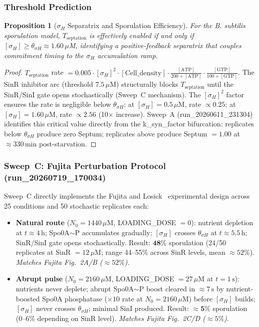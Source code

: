 \documentclass[10pt,letterpaper]{article}
\newtheorem{proposition}{Proposition}
\begin{document}
\subsubsection{Threshold Prediction}

\begin{proposition}[$\sigma_H$ Separatrix and Sporulation Efficiency]
\label{prop:sigmaH_separatrix}
For the \textit{B. subtilis} sporulation model, $T_{\mathrm{septation}}$ is effectively enabled if and only if $[\sigma_H] \geq \theta_{\sigma H} \approx 1.60\,\mu$M, identifying a positive-feedback separatrix that couples commitment timing to the $\sigma_H$ accumulation ramp.
\end{proposition}

\begin{proof}
$T_{\mathrm{septation}}$ rate $= 0.005 \cdot [\sigma_H]^2 \cdot [\text{Cell\_density}] \cdot \frac{[\text{ATP}]}{200 + [\text{ATP}]} \cdot \frac{[\text{GTP}]}{100 + [\text{GTP}]}$.
The SinR inhibitor arc (threshold $7.5\,\mu$M) structurally blocks $T_{\mathrm{septation}}$ until the SinR/SinI gate opens stochastically (Sweep~C mechanism). The $[\sigma_H]^2$ factor ensures the rate is negligible below $\theta_{\sigma H}$: at $[\sigma_H] = 0.5\,\mu$M, rate $\propto 0.25$; at $[\sigma_H] = 1.60\,\mu$M, rate $\propto 2.56$ (10$\times$ increase). Sweep~A (run\_20260611\_231304) identifies this critical value directly from the k\_syn\_factor bifurcation: replicates below $\theta_{\sigma H}$ produce zero Septum; replicates above produce Septum $= 1.00$ at $\approx 330\,\text{min}$ post-starvation.
\end{proof}

\subsubsection{Sweep~C: Fujita Perturbation Protocol (run\_20260719\_170034)}

Sweep~C directly implements the Fujita and Losick~\cite{fujita2005} experimental design across 25 conditions and 50 stochastic replicates each:

\begin{itemize}
\item \textbf{Natural route} ($N_0 = 1440\,\mu$M, LOADING\_DOSE $= 0$): nutrient depletion at $t \approx 4\,\text{h}$; Spo0A$\sim$P accumulates gradually; $[\sigma_H]$ crosses $\theta_{\sigma H}$ at $t \approx 5.5\,\text{h}$; SinR/SinI gate opens stochastically. Result: $\mathbf{48\%}$ sporulation (24/50 replicates at SinR $= 12\,\mu$M; range 44--55\% across SinR levels, mean $\approx 52\%$). \emph{Matches Fujita Fig.~2A/B ($\approx 52\%$)}.
\item \textbf{Abrupt pulse} ($N_0 = 2160\,\mu$M, LOADING\_DOSE $= 27\,\mu$M at $t = 1\,\text{s}$): nutrients never deplete; abrupt Spo0A$\sim$P boost cleared in $\approx 7\,\text{s}$ by nutrient-boosted Spo0A phosphatase ($\times 10$ rate at $N_0 = 2160\,\mu$M) before $[\sigma_H]$ builds; $[\sigma_H]$ never crosses $\theta_{\sigma H}$; minimal SinI produced. Result: $\mathbf{\approx 5\%}$ sporulation (0--6\% depending on SinR level). \emph{Matches Fujita Fig.~2C/D ($\approx 5\%$)}.
\end{itemize}
\end{document}
